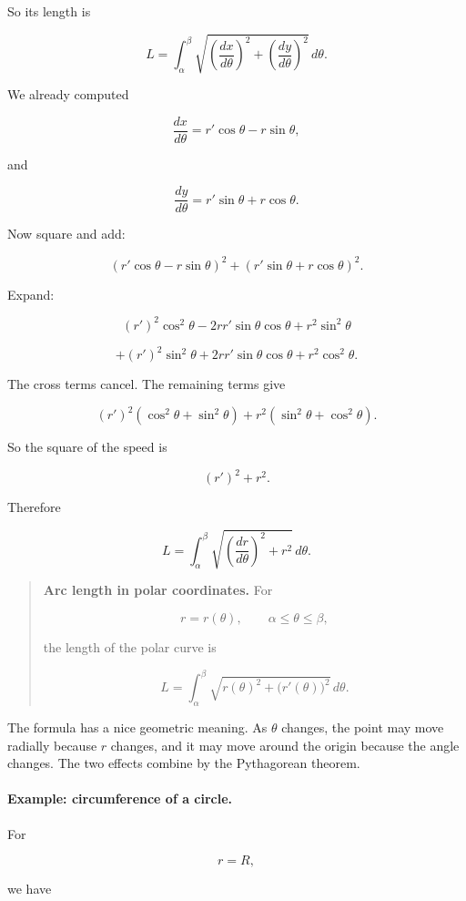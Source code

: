 So its length is

\[
L=\int_\alpha^\beta
\sqrt{\left(\frac{dx}{d\theta}\right)^2+
      \left(\frac{dy}{d\theta}\right)^2}\,d\theta.
\]

We already computed

\[
\frac{dx}{d\theta}
=
r'\cos\theta-r\sin\theta,
\]

and

\[
\frac{dy}{d\theta}
=
r'\sin\theta+r\cos\theta.
\]

Now square and add:

\[
\left(r'\cos\theta-r\sin\theta\right)^2
+
\left(r'\sin\theta+r\cos\theta\right)^2.
\]

Expand:

\[
(r')^2\cos^2\theta-2rr'\sin\theta\cos\theta+r^2\sin^2\theta
\]

\[
+
(r')^2\sin^2\theta+2rr'\sin\theta\cos\theta+r^2\cos^2\theta.
\]

The cross terms cancel.  The remaining terms give

\[
(r')^2(\cos^2\theta+\sin^2\theta)
+
r^2(\sin^2\theta+\cos^2\theta).
\]

So the square of the speed is

\[
(r')^2+r^2.
\]

Therefore

\[
\boxed{
L=\int_\alpha^\beta
\sqrt{\left(\frac{dr}{d\theta}\right)^2+r^2}\,d\theta.
}
\]

\begin{quote}
\textbf{Arc length in polar coordinates.}
For

\[
r=r(\theta),
\qquad
\alpha\le\theta\le\beta,
\]

the length of the polar curve is

\[
\boxed{
L=\int_\alpha^\beta
\sqrt{r(\theta)^2+\bigl(r'(\theta)\bigr)^2}\,d\theta.
}
\]
\end{quote}

The formula has a nice geometric meaning.  As \(\theta\) changes, the point may move
radially because \(r\) changes, and it may move around the origin because the angle
changes.  The two effects combine by the Pythagorean theorem.

\paragraph{Example: circumference of a circle.}
For

\[
r=R,
\]

we have

